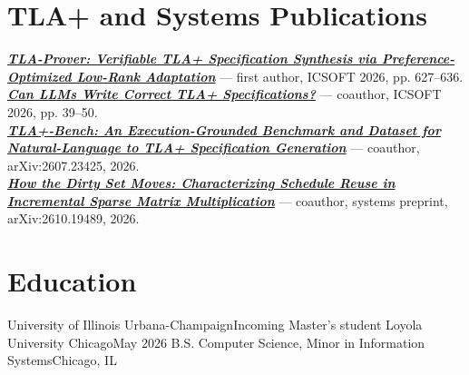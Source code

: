 \documentclass[letterpaper,10pt]{article}
\begin{document}
\section*{TLA+ and Systems Publications}
\begin{itemize}[leftmargin=0.15in, label={}]
  \small{\item{
    \href{https://doi.org/10.5220/0015234600004088}{\textbf{\emph{TLA-Prover: Verifiable TLA+ Specification Synthesis via Preference-Optimized Low-Rank Adaptation}}} --- first author, ICSOFT 2026, pp. 627--636. \\
    \href{https://doi.org/10.5220/0015070400004088}{\textbf{\emph{Can LLMs Write Correct TLA+ Specifications?}}} --- coauthor, ICSOFT 2026, pp. 39--50. \\
    \href{https://arxiv.org/abs/2607.23425}{\textbf{\emph{TLA+-Bench: An Execution-Grounded Benchmark and Dataset for Natural-Language to TLA+ Specification Generation}}} --- coauthor, arXiv:2607.23425, 2026. \\
    \href{https://arxiv.org/abs/2610.19489}{\textbf{\emph{How the Dirty Set Moves: Characterizing Schedule Reuse in Incremental Sparse Matrix Multiplication}}} --- coauthor, systems preprint, arXiv:2610.19489, 2026.
  }}
\end{itemize}

\section*{Education}
\resumeSubHeadingListStart
  \resumeSubheading
    {University of Illinois Urbana-Champaign}{Incoming}
    {Master's student}{}
  \resumeSubheading
    {Loyola University Chicago}{May 2026}
    {B.S. Computer Science, Minor in Information Systems}{Chicago, IL}
    \resumeItemListStart
    \resumeItemListEnd
\resumeSubHeadingListEnd
\end{document}
